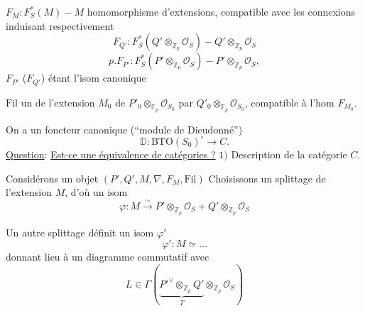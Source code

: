 $F_M:F_S^*(M)\mathbin{-}M$ homomorphisme d'extensions, compatible avec les connexions induisant  respectivement
\[
F_{Q'}:F_S^*(Q'\otimes_{\mathbb Z_p}\mathcal O_S)\mathbin{-}Q'\otimes_{\mathbb Z_p}\mathcal O_S
\]
\[
p.F_{P'}:F_S^*(P'\otimes_{\mathbb Z_p}\mathcal O_S)\mathbin{-}P'\otimes_{\mathbb Z_p}\mathcal O_S,
\]
$F_{P'}$ ($F_{Q'}$) étant l'isom canonique

$\mathrm{Fil}$ un   de l'extension $M_0$ de $P'_0\otimes_{\mathbb F_p}\mathcal O_{S_0}$ par $Q'_0\otimes_{\mathbb F_p}\mathcal O_{S_0}$, compatible à l'hom $F_{M_0}$.

On a un foncteur canonique (``module de Dieudonné'')
\[
\mathbb D:\mathrm{BTO}(S_0)^\circ\longrightarrow C.
\]
\uline{Question}: \uline{Est-ce une équivalence de catégories ?}
$1)$ Description de la catégorie $C$.

Considérons un objet $(P',Q',M,\nabla,F_M,\mathrm{Fil})$  Choisissons un splittage de l'extension $M$, d'où un isom
\[
\varphi:M\overset\sim\longrightarrow P'\otimes_{\mathbb Z_p}\mathcal O_S+Q'\otimes_{\mathbb Z_p}\mathcal O_S
\]

Un autre splittage définit un  isom $\varphi'$
\[
\varphi':M\simeq\ldots
\]
donnant lieu à un diagramme commutatif
avec
\[
L\in\Gamma\left(\underbrace{P'^\vee\otimes_{\mathbb Z_p}Q'}_T\otimes_{\mathbb Z_p}\mathcal O_S\right)
\]

